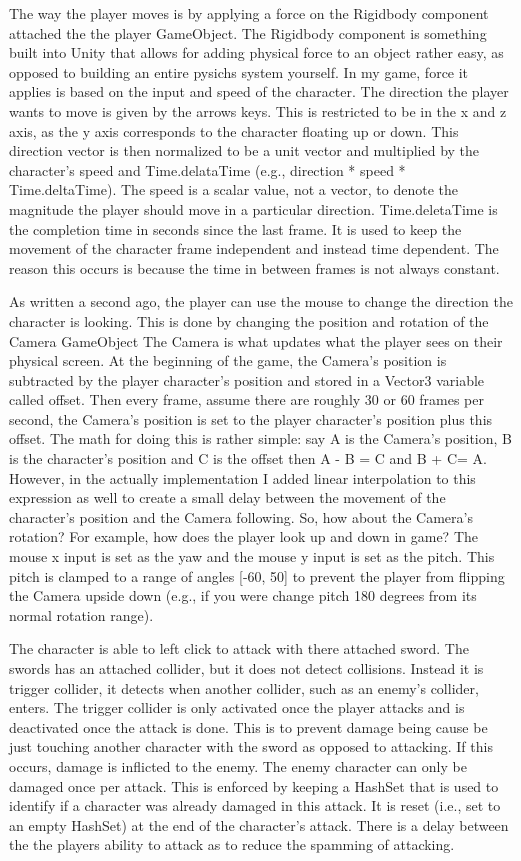 \documentclass[conference]{IEEEtran}
\begin{document}
The way the player moves is by applying a force on the Rigidbody component attached the the player GameObject.
The Rigidbody component  is something built into Unity that allows for adding physical force  to an object rather easy, as opposed to building an entire pysichs system yourself.
In my game, force it applies is based on the input and speed of the character.
The direction the player wants to move is given by the arrows keys.
This is restricted to be in the x and z axis, as the y axis corresponds to the character floating up or down.
This direction vector is then normalized to be a unit vector and multiplied by the character’s speed and Time.delataTime (e.g., direction * speed * Time.deltaTime).
The speed is a scalar value, not a vector, to denote the magnitude the player should move in a particular direction.
Time.deletaTime is the completion time in seconds since the last frame.
It is used to keep the movement of the character frame independent and instead time dependent.
The reason this occurs is because the time in between frames is not always constant.

As written a second ago, the player can use the mouse to change the direction the character is looking.
This is done by changing the position and rotation of the Camera GameObject
The Camera is what  updates what the player sees on their physical screen.
At the beginning of the game, the Camera’s position is subtracted by the player character’s position and stored in a Vector3 variable called offset.
Then every frame, assume there are roughly 30 or 60 frames per second, the Camera’s position is set to the player character’s position plus this offset.
The math for doing this is rather simple: say A is the Camera’s position, B is the character’s position and C is the offset then A - B = C and B + C= A.
However, in the actually implementation I added linear interpolation to this expression as well to create a small delay between the movement of the character’s position and the Camera following.
So, how about the Camera’s rotation?
For example, how does the player look up and down in game?
The mouse x input is set as the yaw and the mouse y input is set as the pitch.
This pitch is clamped to a range of angles [-60, 50] to prevent the player from flipping the Camera upside down (e.g., if you were change pitch 180 degrees from its normal rotation range).

The character is able to left click to attack with there attached sword.
The swords has an attached collider, but it does not detect collisions.
Instead it is trigger collider, it detects when another collider, such as an enemy’s collider, enters.
The trigger collider is only activated once the player attacks and is deactivated once the attack is done.
This is to prevent damage being cause be just touching another character with the sword as opposed to attacking.
If this occurs, damage is inflicted to the enemy.
The enemy character can only be damaged once per attack.
This is enforced by keeping a HashSet that is used to identify if a character was already damaged in this attack.
It is reset (i.e., set to an empty HashSet) at the end of the character’s attack.
There is a delay between the the players ability to attack as to reduce the spamming of attacking.
\end{document}
